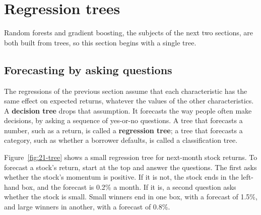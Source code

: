 \section{Regression trees}
\label{sec:21-trees}

Random forests and gradient boosting, the subjects of the next two sections, are both built from trees, so this section begins with a single tree.

\subsection{Forecasting by asking questions}

The regressions of the previous section assume that each characteristic has the same effect on expected returns, whatever the values of the other characteristics. A \textbf{decision tree} drops that assumption. It forecasts the way people often make decisions, by asking a sequence of yes-or-no questions. A tree that forecasts a number, such as a return, is called a \textbf{regression tree}; a tree that forecasts a category, such as whether a borrower defaults, is called a classification tree.

Figure~\ref{fig:21-tree} shows a small regression tree for next-month stock returns. To forecast a stock's return, start at the top and answer the questions. The first asks whether the stock's momentum is positive. If it is not, the stock ends in the left-hand box, and the forecast is 0.2\% a month. If it is, a second question asks whether the stock is small. Small winners end in one box, with a forecast of 1.5\%, and large winners in another, with a forecast of 0.8\%.


